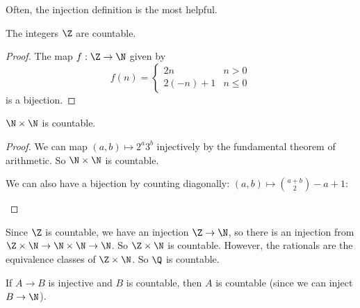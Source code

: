 \documentclass[a4paper]{article}
\begin{document}
Often, the injection definition is the most helpful.

\begin{prop}
  The integers $\Z$ are countable.
\end{prop}
\begin{proof}
  The map $f: \Z\to \N$ given by
  \[
    f(n) =
    \begin{cases}
      2n & n > 0\\
      2(-n) + 1 & n \leq 0
    \end{cases}
  \]
  is a bijection.
\end{proof}

\begin{prop}
  $\N \times \N$ is countable.
\end{prop}
\begin{proof}
  We can map $(a, b)\mapsto 2^a3^b$ injectively by the fundamental theorem of arithmetic. So $\N\times \N$ is countable.

  We can also have a bijection by counting diagonally: $(a, b) \mapsto \binom{a + b}{2} - a + 1$:
  \begin{center}
  \end{center}
\end{proof}

Since $\Z$ is countable, we have an injection $\Z\to \N$, so there is an injection from $\Z\times \N\to \N\times \N \to \N$. So $\Z \times \N$ is countable. However, the rationals are the equivalence classes of $\Z\times\N$. So $\Q$ is countable.

\begin{prop}
  If $A\to B$ is injective and $B$ is countable, then $A$ is countable (since we can inject $B \to \N$).
\end{prop}
\end{document}
